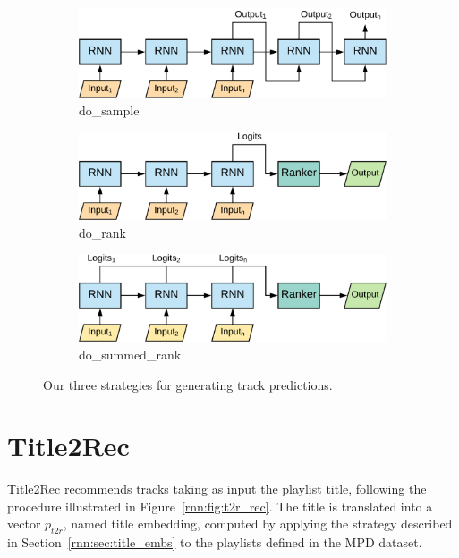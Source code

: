 \begin{figure}
\centering
\begin{subfigure}{.8\textwidth}
\includegraphics[width=\textwidth]{sample}
\caption{do\_sample}
\bigskip
\end{subfigure}
\begin{subfigure}{.8\textwidth}
\includegraphics[width=\textwidth]{rank}
\caption{do\_rank}
\bigskip
\end{subfigure}
\begin{subfigure}{.8\textwidth}
\includegraphics[width=\textwidth]{summed}
\caption{do\_summed\_rank}
\end{subfigure}
\caption[Strategies for generating track predictions]{Our three strategies for generating track predictions.}
\label{rnn:fig:predictions}
\end{figure}

\section{Title2Rec}
\label{rnn:sec:t2r}

Title2Rec recommends tracks taking as input the playlist title, following the procedure illustrated in Figure~\ref{rnn:fig:t2r_rec}. The title is translated into a vector $p_{t2r}$, named title embedding, computed by applying the strategy described in Section~\ref{rnn:sec:title_embs} to the playlists defined in the MPD dataset.


